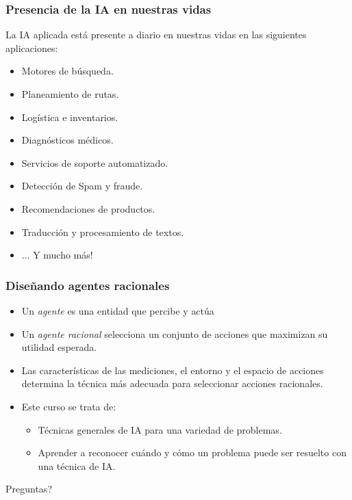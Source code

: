 \documentclass[10pt]{beamer}
\begin{document}
\begin{frame}
    \frametitle{Presencia de la IA en nuestras vidas}
    La IA aplicada está presente a diario en nuestras vidas en las siguientes aplicaciones:

    \begin{itemize}
        \item Motores de búsqueda.
        \item Planeamiento de rutas.
        \item Logística e inventarios.
        \item Diagnósticos médicos.
        \item Servicios de soporte automatizado.
        \item Detección de Spam y fraude.
        \item Recomendaciones de productos.
        \item Traducción y procesamiento de textos.
        \pause
        \item ... Y mucho más!
    \end{itemize}
\end{frame}

\begin{frame}
    \frametitle{Diseñando agentes racionales}
    \begin{itemize}
        \item Un \textit{agente} es una entidad que \alert{percibe} y \alert{actúa}
        \item Un \textit{agente racional} selecciona un conjunto de acciones que 
        \alert{maximizan} su utilidad esperada.
        \item Las características de las mediciones, el entorno y el espacio de 
        acciones determina la técnica más adecuada para seleccionar acciones racionales.
        \pause 
        \item Este curso se trata de:
            \begin{itemize}
                \item Técnicas generales de IA para una variedad de problemas.
                \item Aprender a reconocer \alert{cuándo} y \alert{cómo} un problema puede ser resuelto con 
                una técnica de IA.
            \end{itemize}
    \end{itemize}
\end{frame}


{
\begin{frame}[standout]
  Preguntas?
\end{frame}
}
\end{document}
